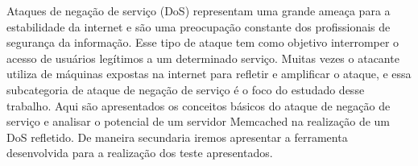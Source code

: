 Ataques de negação de serviço (DoS) representam uma grande ameaça para a estabilidade da internet e são uma preocupação constante dos profissionais de segurança da informação. Esse tipo de ataque tem como objetivo interromper o acesso de usuários legítimos a um determinado serviço. Muitas vezes o atacante utiliza de máquinas expostas na internet para refletir e amplificar o ataque, e essa subcategoria de ataque de negação de serviço é o foco do estudado desse trabalho. Aqui são apresentados os conceitos básicos do ataque de negação de serviço e analisar o potencial de um servidor Memcached na realização de um DoS refletido. De maneira secundaria iremos apresentar a ferramenta desenvolvida para a realização dos teste apresentados.